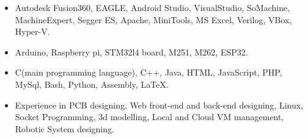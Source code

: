\documentclass[10pt,a4paper,ragged2e]{altacv}
\begin{document}
\smallskip
\begin{itemize}
\item Autodesk Fusion360, EAGLE, Android Studio, VisualStudio, SoMachine, MachineExpert, Segger ES, Apache, MiniTools, MS Excel, Verilog, VBox, Hyper-V.
\smallskip
\item Arduino, Raspberry pi, STM32l4 board, M251, M262, ESP32.
\smallskip
\item C(main programming language), C++, Java, HTML, JavaScript, PHP, MySql, Bash, Python, Assembly, LaTeX.
\linebreak
\divider
\item Experience in PCB designing, Web front-end and back-end designing, Linux, Socket Programming, 3d modelling, Local and Cloud VM management, Robotic System designing.
\end{itemize}


\clearpage

\nocite{*}
\end{document}
